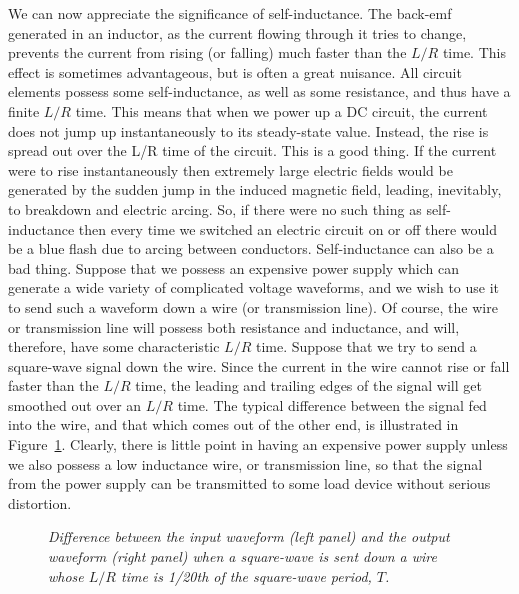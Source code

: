 We can now appreciate the significance of self-inductance. The back-emf 
generated in an inductor, as the current flowing through it tries to change, prevents the
current from rising (or falling) much faster than the $L/R$ time. This effect is
sometimes advantageous, but  is often a great nuisance.
All circuit elements possess some self-inductance, as well as some resistance, and thus have a finite $L/R$ time. This means that when we power up a DC circuit, the current
does not jump up instantaneously to its steady-state value. Instead, the
rise is spread out over the L/R time of the circuit. This is a good thing.
If the current were to rise instantaneously then extremely large electric
fields would be generated by the sudden jump in the induced magnetic field, leading,
inevitably, to breakdown and electric arcing. So, if there were no such thing
as self-inductance then every time we switched an electric circuit on or off
there would be a blue flash due to arcing between conductors. Self-inductance
can also be a bad thing. Suppose that we possess an expensive power supply which can generate a wide variety of complicated voltage waveforms, and we wish
to use it to send such a waveform down a wire (or transmission line).
Of course, the wire or transmission line will possess both resistance and inductance,
and will, therefore, have some characteristic $L/R$ time. Suppose that we
try to send a square-wave signal down the wire. Since the current in the wire
cannot rise or fall faster than the $L/R$ time,  the leading and trailing edges of
the signal will get smoothed out over an $L/R$ time. The typical difference between
the signal fed into the wire, and that which comes out of the
other end, is illustrated in Figure~\ref{fsquare}. Clearly, there is little
point in having an expensive power supply unless we also possess a low inductance
wire, or transmission line, so that the signal from the power supply can be
transmitted to some load device without serious distortion. 
\begin{figure}
\centerline{}
\caption{\em Difference between the input waveform (left panel) and
the output waveform (right panel) when a square-wave is sent down a
wire whose $L/R$ time is 1/20th of the square-wave period, $T$.}\label{fsquare}
\end{figure}


